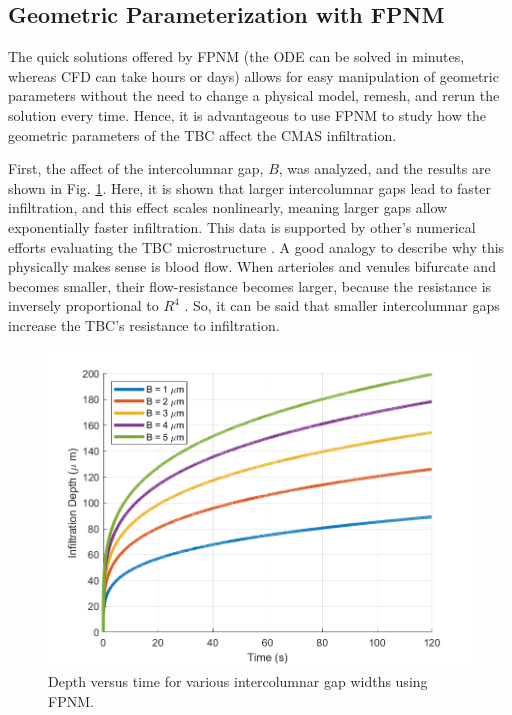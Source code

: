 \documentclass[%
 aip,
 amsmath,amssymb,
 reprint,%
floatfix]{revtex4-1}
\begin{document}
\subsection{Geometric Parameterization with FPNM}

The quick solutions offered by FPNM (the ODE can be solved in minutes, whereas CFD can take hours or days) allows for easy manipulation of geometric parameters without the need to change a physical model, remesh, and rerun the solution every time. Hence, it is advantageous to use FPNM to study how the geometric parameters of the TBC affect the CMAS infiltration.

First, the affect of the intercolumnar gap, $B$, was analyzed, and the results are shown in Fig. \ref{fig:columnGapStudy}. 
Here, it is shown that larger intercolumnar gaps lead to faster infiltration, and this effect scales nonlinearly, meaning larger gaps allow exponentially faster infiltration. 
This data is supported by other's numerical efforts evaluating the TBC microstructure \cite{Sirigiri2018}.
A good analogy to describe why this physically makes sense is blood flow. When arterioles and venules bifurcate and becomes smaller, their flow-resistance becomes larger, because the resistance is inversely proportional to $R^{4}$ \cite{Chandran2012}. So, it can be said that smaller intercolumnar gaps increase the TBC's resistance to infiltration.

\begin{figure}
    \centering
    \includegraphics[width=\linewidth]{Figures/intercolumnarGapStudy.png}
    \caption{Depth versus time for various intercolumnar gap widths using FPNM.}
    \label{fig:columnGapStudy}
\end{figure}
\end{document}
